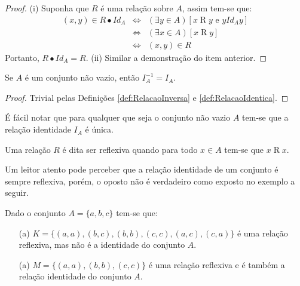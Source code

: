 \begin{proof}
	(i) Suponha que $R$ é uma relação sobre $A$, assim tem-se que:
	\begin{eqnarray*}
		(x, y) \in R \bullet Id_A  & \Longleftrightarrow & (\exists y \in A)[x \mathrel{R} y \text{ e } y \mathrel{Id_A} y]\\
		& \Longleftrightarrow & (\exists x \in A)[x \mathrel{R} y]\\
		& \Longleftrightarrow & (x, y) \in R 
	\end{eqnarray*}
	Portanto,  $R \bullet Id_A = R$. (ii) Similar a demonstração do item anterior.
\end{proof}

\begin{proposition}\label{prop:ComplementarDaRelacaoIdentica}
	Se $A$ é um conjunto não vazio, então $I_A^{-1} = I_A$.
\end{proposition}

\begin{proof}
	Trivial pelas Definições \ref{def:RelacaoInversa} e \ref{def:RelacaoIdentica}.
\end{proof}

\begin{remark}\label{rema:UnicidadeDaRelacaoIdentica}
	É fácil notar que para qualquer que seja o conjunto não vazio $A$ tem-se que a relação identidade $I_A$ é única.
\end{remark}

\begin{definition}\label{def:RelacaoReflexiva}
	Uma relação $R$ é dita ser reflexiva quando para todo $x \in A$ tem-se que $x \mathrel{R} x$.
\end{definition}

Um leitor atento pode perceber que a relação identidade de um conjunto é sempre reflexiva, porém, o oposto não é verdadeiro como exposto no exemplo a seguir.

\begin{example}
	Dado o conjunto $A = \{a, b, c\}$ tem-se que: 
	\begin{itemize}
		\item[(a)] $K = \{(a, a), (b, c), (b, b), (c, c), (a, c), (c, a)\}$ é uma relação reflexiva, mas não é a identidade do conjunto $A$.
		\item[(a)] $M = \{(a, a), (b, b), (c, c) \}$ é uma relação reflexiva e é  também a relação identidade do conjunto $A$.
	\end{itemize}
\end{example}


